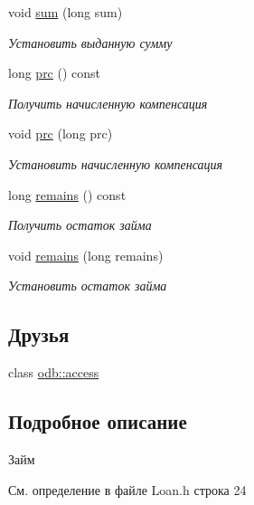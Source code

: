 \begin{DoxyCompactItemize}
void \hyperlink{classkpk_1_1data_1_1_loan_a07ba28ed26a7a422b5c2435dbacd3825}{sum} (long sum)
\begin{DoxyCompactList}\small\item\em Установить выданную сумму \end{DoxyCompactList}\item 
long \hyperlink{classkpk_1_1data_1_1_loan_aabe63b94775011f6c971d8fb7a9cf5b0}{prc} () const 
\begin{DoxyCompactList}\small\item\em Получить начисленную компенсация \end{DoxyCompactList}\item 
void \hyperlink{classkpk_1_1data_1_1_loan_ae7141c53eac6c77d33c9e78eca17427d}{prc} (long prc)
\begin{DoxyCompactList}\small\item\em Установить начисленную компенсация \end{DoxyCompactList}\item 
long \hyperlink{classkpk_1_1data_1_1_loan_a3a85e20cceb9a563153d51fe07f15262}{remains} () const 
\begin{DoxyCompactList}\small\item\em Получить остаток займа \end{DoxyCompactList}\item 
void \hyperlink{classkpk_1_1data_1_1_loan_a242c59d916d1d2dd17d579bfac388e4a}{remains} (long remains)
\begin{DoxyCompactList}\small\item\em Установить остаток займа \end{DoxyCompactList}\end{DoxyCompactItemize}
\subsection*{Друзья}
\begin{DoxyCompactItemize}
\item 
class \hyperlink{classkpk_1_1data_1_1_loan_acb4d953abf85ae525f1d06a0c3a86a55}{odb\+::access}
\end{DoxyCompactItemize}


\subsection{Подробное описание}
Займ 

См. определение в файле Loan.\+h строка 24



